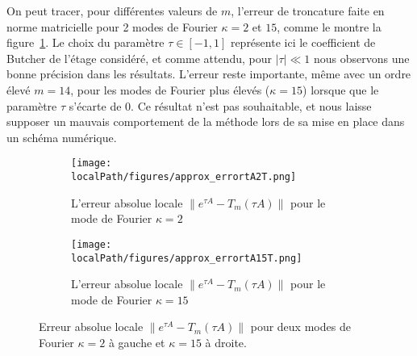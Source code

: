On peut tracer, pour différentes valeurs de $m$, l'erreur de troncature faite en norme matricielle pour 2 modes de Fourier $\kappa=2$ et $15$, comme le montre la figure~\ref{fig:taylor:error}. Le choix du paramètre $\tau\in[-1,1]$ représente ici le coefficient de Butcher de l'étage considéré, et comme attendu, pour $|\tau|\ll1$ nous observons une bonne précision dans les résultats. L'erreur reste importante, même avec un ordre élevé $m=14$, pour les modes de Fourier plus élevés ($\kappa=15$) lorsque que le paramètre $\tau$ s'écarte de $0$. Ce résultat n'est pas souhaitable, et nous laisse supposer un mauvais comportement de la méthode lors de sa mise en place dans un schéma numérique.


\begin{figure}
  \begin{subfigure}{.5\textwidth}
    \centering
    \texttt{[image: \\localPath/figures/approx\_errortA2T.png]}
    \caption{L'erreur absolue locale $\|e^{\tau A}-T_m(\tau A)\|$ pour le mode de Fourier $\kappa=2$}
  \end{subfigure}
  \begin{subfigure}{.5\textwidth}
    \centering
    \texttt{[image: \\localPath/figures/approx\_errortA15T.png]}
    \caption{L'erreur absolue locale $\|e^{\tau A}-T_m(\tau A)\|$ pour le mode de Fourier $\kappa=15$}
  \end{subfigure}
  \caption{Erreur absolue locale $\|e^{\tau A}-T_m(\tau A)\|$ pour deux modes de Fourier $\kappa=2$ à gauche et $\kappa=15$ à droite.}
  \label{fig:taylor:error}
\end{figure}

